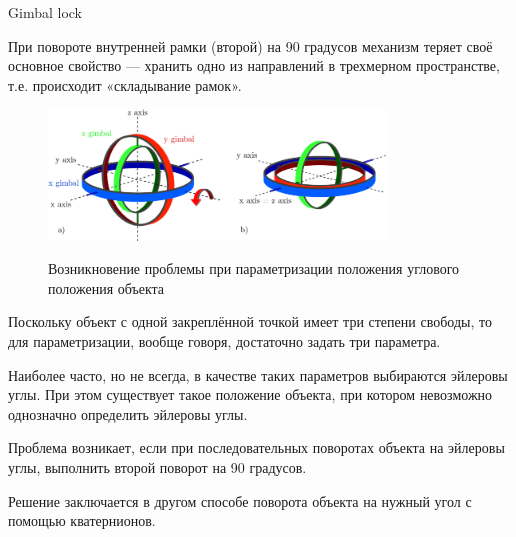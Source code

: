 \documentclass{beamer}
\begin{document}
	\begin{frame}{Gimbal lock}

		При повороте внутренней рамки (второй) на 90 градусов механизм теряет своё основное свойство — хранить одно из направлений в трехмерном пространстве, т.е. происходит «складывание рамок».
		
			\begin{figure} 
				\href{https://youtu.be/zc8b2Jo7mno?feature=shared&t=79}{
					\includegraphics[width=0.8\textwidth]{images/llustrates-the-principle-of-gimbal-lock.png}}
				\caption{Возникновение проблемы при параметризации положения углового положения объекта}
			\end{figure}

		
		\note
		{

			Поскольку объект с одной закреплённой точкой имеет три степени свободы, то для параметризации, вообще говоря, достаточно задать три параметра. 
			
			Наиболее часто, но не всегда, в качестве таких параметров выбираются эйлеровы углы. 
			При этом существует такое положение объекта, при котором невозможно однозначно определить эйлеровы углы.

			Проблема возникает, если при последовательных поворотах объекта на эйлеровы углы, выполнить второй поворот на 90 градусов.

			Решение заключается в другом способе поворота объекта на нужный угол с помощью кватернионов.
		}

	
	\end{frame}
\end{document}
